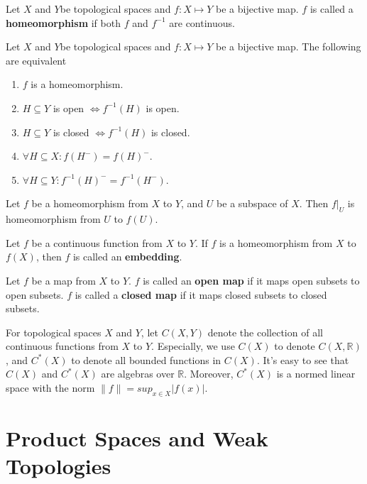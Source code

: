 \documentclass[12pt]{book}
\begin{document}
\begin{definition}
	Let $X$ and $Y$be topological spaces and $f:X\mapsto Y$ be a bijective map. $f$ is called a {\bf homeomorphism} if both $f$ and $f^{-1}$ are continuous.
\end{definition}
\begin{theorem}
	Let $X$ and $Y$be topological spaces and $f:X\mapsto Y$ be a bijective map. The following are equivalent
	\begin{enumerate}
		\item $f$ is a homeomorphism.
		\item $H\subseteq Y$ is open $\Leftrightarrow f^{-1}(H)$ is open.
		\item $H\subseteq Y$ is closed $\Leftrightarrow f^{-1}(H)$ is closed.
		\item $\forall H\subseteq X: f(H^-)= f(H)^-$.
		\item $\forall H\subseteq Y: f^{-1}(H)^-= f^{-1}(H^-)$.
	\end{enumerate}
\end{theorem}

\begin{theorem}
	Let $f$ be a homeomorphism from $X$ to $Y$, and $U$ be a subspace of $X$. Then $f|_U$ is homeomorphism from $U$ to $f(U)$.
\end{theorem}

\begin{definition}
	Let $f$ be a continuous function from $X$ to $Y$. If $f$ is a homeomorphism from $X$ to $f(X)$, then $f$ is called an {\bf embedding}.
\end{definition}

\begin{definition}
	Let $f$ be a map from $X$ to $Y$. $f$ is called an {\bf open map} if it maps open subsets to open subsets. $f$ is called a {\bf closed map} if it maps closed subsets to closed subsets.
\end{definition}

\begin{example}
	For topological spaces $X$ and $Y$, let $C(X,Y)$ denote the collection of all continuous functions from $X$ to $Y$. Especially, we use $C(X)$ to denote $C(X,\mathbb R)$, and $C^*(X)$ to denote all bounded functions in $C(X)$. It's easy to see that $C(X)$ and $C^*(X)$ are algebras over $\mathbb R$. Moreover, $C^*(X)$ is a normed linear space with the norm $\|f\|=sup_{x\in X}|f(x)|$.
\end{example}
\section{Product Spaces and Weak Topologies}
\end{document}
